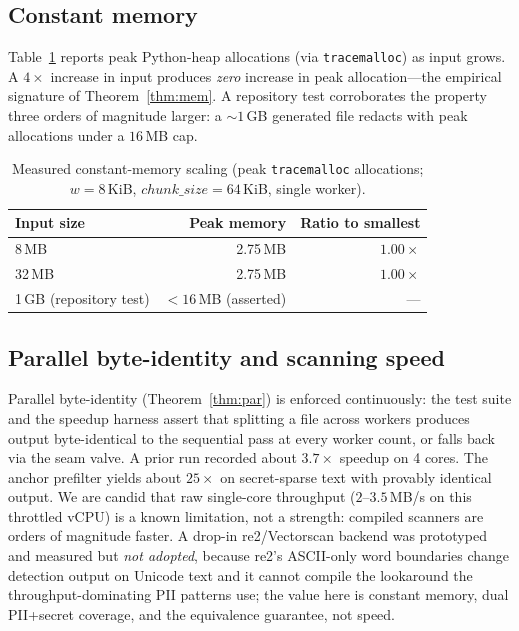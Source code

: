 \documentclass[runningheads]{llncs}
\begin{document}
\subsection{Constant memory}
Table~\ref{tab:memory} reports peak Python-heap allocations (via
\texttt{tracemalloc}) as input grows. A $4\times$ increase in input produces
\emph{zero} increase in peak allocation---the empirical signature of
Theorem~\ref{thm:mem}. A repository test corroborates the property three orders
of magnitude larger: a $\sim\!1$\,GB generated file redacts with peak allocations
under a $16$\,MB cap.

\begin{table}[t]
\centering
\caption{Measured constant-memory scaling (peak \texttt{tracemalloc}
allocations; $w=8$\,KiB, $\mathit{chunk\_size}=64$\,KiB, single worker).}
\label{tab:memory}
\begin{tabular}{@{}lrr@{}}
\toprule
Input size & Peak memory & Ratio to smallest \\
\midrule
8\,MB  & 2.75\,MB & $1.00\times$ \\
32\,MB & 2.75\,MB & $1.00\times$ \\
1\,GB (repository test) & $<16$\,MB (asserted) & --- \\
\bottomrule
\end{tabular}
\end{table}

\subsection{Parallel byte-identity and scanning speed}
Parallel byte-identity (Theorem~\ref{thm:par}) is enforced continuously: the
test suite and the speedup harness assert that splitting a file across workers
produces output byte-identical to the sequential pass at every worker count, or
falls back via the seam valve. A prior run recorded about $3.7\times$ speedup on
4 cores. The anchor prefilter yields about $25\times$ on secret-sparse text with
provably identical output. We are candid that raw single-core throughput
($2$--$3.5$\,MB/s on this throttled vCPU) is a known limitation, not a strength:
compiled scanners are orders of magnitude faster. A drop-in re2/Vectorscan
backend was prototyped and measured but \emph{not adopted}, because re2's
ASCII-only word boundaries change detection output on Unicode text and it cannot
compile the lookaround the throughput-dominating PII patterns use; the value here
is constant memory, dual PII+secret coverage, and the equivalence guarantee,
not speed.
\end{document}
